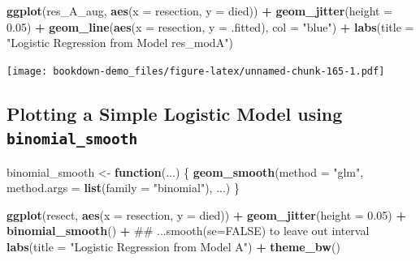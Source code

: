\documentclass[]{book}
\newenvironment{Shaded}{\begin{snugshade}}{\end{snugshade}}
\newcommand{\KeywordTok}[1]{\textcolor[rgb]{0.13,0.29,0.53}{\textbf{#1}}}
\newcommand{\DataTypeTok}[1]{\textcolor[rgb]{0.13,0.29,0.53}{#1}}
\newcommand{\FloatTok}[1]{\textcolor[rgb]{0.00,0.00,0.81}{#1}}
\newcommand{\StringTok}[1]{\textcolor[rgb]{0.31,0.60,0.02}{#1}}
\newcommand{\ControlFlowTok}[1]{\textcolor[rgb]{0.13,0.29,0.53}{\textbf{#1}}}
\newcommand{\OperatorTok}[1]{\textcolor[rgb]{0.81,0.36,0.00}{\textbf{#1}}}
\newcommand{\NormalTok}[1]{#1}
\theoremstyle{definition}
\theoremstyle{definition}
\theoremstyle{definition}
\theoremstyle{remark}
\begin{document}
\begin{Shaded}
\begin{Highlighting}[]
\KeywordTok{ggplot}\NormalTok{(res_A_aug, }\KeywordTok{aes}\NormalTok{(}\DataTypeTok{x =}\NormalTok{ resection, }\DataTypeTok{y =}\NormalTok{ died)) }\OperatorTok{+}
\StringTok{    }\KeywordTok{geom_jitter}\NormalTok{(}\DataTypeTok{height =} \FloatTok{0.05}\NormalTok{) }\OperatorTok{+}
\StringTok{    }\KeywordTok{geom_line}\NormalTok{(}\KeywordTok{aes}\NormalTok{(}\DataTypeTok{x =}\NormalTok{ resection, }\DataTypeTok{y =}\NormalTok{ .fitted), }
              \DataTypeTok{col =} \StringTok{"blue"}\NormalTok{) }\OperatorTok{+}
\StringTok{    }\KeywordTok{labs}\NormalTok{(}\DataTypeTok{title =} \StringTok{"Logistic Regression from Model res_modA"}\NormalTok{)}
\end{Highlighting}
\end{Shaded}

\texttt{[image: bookdown-demo\_files/figure-latex/unnamed-chunk-165-1.pdf]}

\subsection{\texorpdfstring{Plotting a Simple Logistic Model using
\texttt{binomial\_smooth}}{Plotting a Simple Logistic Model using binomial\_smooth}}\label{plotting-a-simple-logistic-model-using-binomial_smooth}

\begin{Shaded}
\begin{Highlighting}[]
\NormalTok{binomial_smooth <-}\StringTok{ }\ControlFlowTok{function}\NormalTok{(...) \{}
  \KeywordTok{geom_smooth}\NormalTok{(}\DataTypeTok{method =} \StringTok{"glm"}\NormalTok{, }
              \DataTypeTok{method.args =} \KeywordTok{list}\NormalTok{(}\DataTypeTok{family =} \StringTok{"binomial"}\NormalTok{), ...)}
\NormalTok{\}}

\KeywordTok{ggplot}\NormalTok{(resect, }\KeywordTok{aes}\NormalTok{(}\DataTypeTok{x =}\NormalTok{ resection, }\DataTypeTok{y =}\NormalTok{ died)) }\OperatorTok{+}
\StringTok{  }\KeywordTok{geom_jitter}\NormalTok{(}\DataTypeTok{height =} \FloatTok{0.05}\NormalTok{) }\OperatorTok{+}
\StringTok{  }\KeywordTok{binomial_smooth}\NormalTok{() }\OperatorTok{+}\StringTok{ }\NormalTok{## ...smooth(se=FALSE) to leave out interval}
\StringTok{  }\KeywordTok{labs}\NormalTok{(}\DataTypeTok{title =} \StringTok{"Logistic Regression from Model A"}\NormalTok{) }\OperatorTok{+}
\StringTok{  }\KeywordTok{theme_bw}\NormalTok{()}
\end{Highlighting}
\end{Shaded}
\end{document}
